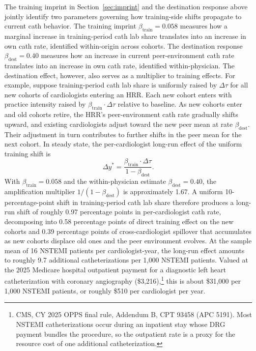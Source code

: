 \documentclass[12pt]{article}
\begin{document}
The training imprint in Section~\ref{sec:imprint} and the destination response above jointly identify two parameters governing how training-side shifts propagate to current cath behavior. The training imprint $\beta_{\text{train}} = 0.058$ measures how a marginal increase in training-period cath lab share translates into an increase in own cath rate, identified within-origin across cohorts. The destination response $\beta_{\text{dest}} = 0.40$ measures how an increase in current peer-environment cath rate translates into an increase in own cath rate, identified within-physician. The destination effect, however, also serves as a multiplier to training effects. For example, suppose training-period cath lab share is uniformly raised by $\Delta\tau$ for all new cohorts of cardiologists entering an HRR. Each new cohort enters with practice intensity raised by $\beta_{\text{train}} \cdot \Delta\tau$ relative to baseline. As new cohorts enter and old cohorts retire, the HRR's peer-environment cath rate gradually shifts upward, and existing cardiologists adjust toward the new peer mean at rate $\beta_{\text{dest}}$. Their adjustment in turn contributes to further shifts in the peer mean for the next cohort. In steady state, the per-cardiologist long-run effect of the uniform training shift is
\begin{equation}\label{eq:multiplier}
\Delta y^{*} = \frac{\beta_{\text{train}} \cdot \Delta\tau}{1 - \beta_{\text{dest}}}.
\end{equation}
With $\beta_{\text{train}} = 0.058$ and the within-physician estimate $\beta_{\text{dest}} = 0.40$, the amplification multiplier $1/(1 - \beta_{\text{dest}})$ is approximately 1.67. A uniform 10-percentage-point shift in training-period cath lab share therefore produces a long-run shift of roughly 0.97 percentage points in per-cardiologist cath rate, decomposing into 0.58 percentage points of direct training effect on the new cohorts and 0.39 percentage points of cross-cardiologist spillover that accumulates as new cohorts displace old ones and the peer environment evolves. At the sample mean of 16 NSTEMI patients per cardiologist-year, the long-run effect amounts to roughly 9.7 additional catheterizations per 1,000 NSTEMI patients. Valued at the 2025 Medicare hospital outpatient payment for a diagnostic left heart catheterization with coronary angiography (\$3,216),\footnote{CMS, CY 2025 OPPS final rule, Addendum B, CPT 93458 (APC 5191). Most NSTEMI catheterizations occur during an inpatient stay whose DRG payment bundles the procedure, so the outpatient rate is a proxy for the resource cost of one additional catheterization.} this is about \$31,000 per 1,000 NSTEMI patients, or roughly \$510 per cardiologist per year.
\end{document}
